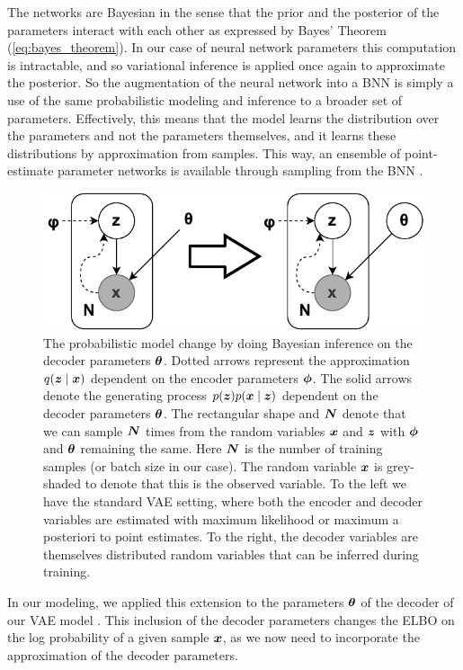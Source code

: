 The networks are Bayesian in the sense that the prior and the posterior of the parameters interact with each other as expressed by Bayes' Theorem (\ref{eq:bayes_theorem}). In our case of neural network parameters this computation is intractable, and so variational inference is applied once again to approximate the posterior. So the augmentation of the neural network into a BNN is simply a use of the same probabilistic modeling and inference to a broader set of parameters. Effectively, this means that the model learns the distribution over the parameters and not the parameters themselves, and it learns these distributions by approximation from samples. This way, an ensemble of point-estimate parameter networks is available through sampling from the BNN \cite{blundell2015weight}.
\begin{figure}[H]
    \centering
    \includegraphics{report/figures/BNN.pdf}
    \caption{The probabilistic model change by doing Bayesian inference on the decoder parameters $\bm{ \theta }$. Dotted arrows represent the approximation $q(\bm{ z } \mid \bm{ x })$ dependent on the encoder parameters $\bm{ \phi }$. The solid arrows denote the generating process $p(\bm{ z }) p(\bm{ x } \mid \bm{ z })$ dependent on the decoder parameters $\bm{ \theta }$. The rectangular shape and $\bm{ N }$ denote that we can sample $\bm{ N }$ times from the random variables $\bm{ x }$ and $\bm{ z }$ with $\bm{ \phi }$ and $\bm{ \theta }$ remaining the same. Here $\bm{ N }$ is the number of training samples (or batch size in our case). The random variable $\bm{ x }$ is grey-shaded to denote that this is the observed variable. To the left we have the standard VAE setting, where both the encoder and decoder variables are estimated with maximum likelihood or maximum a posteriori to point estimates. To the right, the decoder variables are themselves distributed random variables that can be inferred during training.}
    \label{fig:bnn}
\end{figure}

In our modeling, we applied this extension to the parameters $\bm{ \theta }$ of the decoder of our VAE model \cite[Appendix F]{kingma2013auto}. This inclusion of the decoder parameters changes the ELBO on the log probability of a given sample $\bm{ x }$, as we now need to incorporate the approximation of the decoder parameters.

